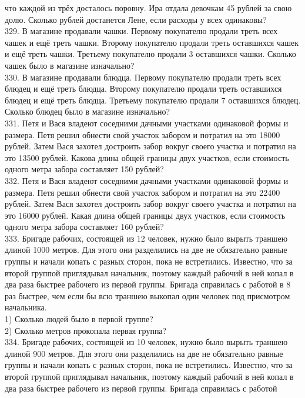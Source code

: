 \documentclass[12pt]{article}
\begin{document}
что каждой из трёх досталось поровну. Ира отдала девочкам 45 рублей за свою долю. Сколько рублей достанется Лене, если расходы у всех одинаковы?\\
329. В магазине продавали чашки. Первому покупателю продали треть всех чашек и ещё треть чашки. Второму покупателю продали треть оставшихся чашек и ещё
треть чашки. Третьему покупателю продали 3 оставшихся чашки. Сколько чашек было в магазине изначально?\\
330. В магазине продавали блюдца. Первому покупателю продали треть всех блюдец и ещё треть блюдца. Второму покупателю продали треть оставшихся блюдец
и ещё треть блюдца. Третьему покупателю продали 7 оставшихся блюдец. Сколько блюдец было в магазине изначально?\\
331. Петя и Вася владеют соседними дачными участками одинаковой формы и размера. Петя решил
обнести свой участок забором и потратил на это 18000 рублей. Затем Вася захотел достроить забор
вокруг своего участка и потратил на это 13500 рублей. Какова длина общей границы двух участков,
если стоимость одного метра забора составляет 150 рублей?\\
332.  Петя и Вася владеют соседними дачными участками одинаковой формы и размера. Петя решил
обнести свой участок забором и потратил на это 22400 рублей. Затем Вася захотел достроить забор
вокруг своего участка и потратил на это 16000 рублей. Какая длина общей границы двух участков,
если стоимость одного метра забора составляет 160 рублей?\\
333.  Бригаде рабочих, состоящей из 12 человек, нужно было вырыть траншею длиной 1000 метров.
Для этого они разделились на две не обязательно равные группы и начали копать с разных сторон,
пока не встретились. Известно, что за второй группой приглядывал начальник, поэтому каждый
рабочий в ней копал в два раза быстрее рабочего из первой группы. Бригада справилась с работой
в 8 раз быстрее, чем если бы всю траншею выкопал один человек под присмотром начальника.\\
1) Сколько людей было в первой группе?\\
2) Сколько метров прокопала первая группа?\\
334. Бригаде рабочих, состоящей из 10 человек, нужно было вырыть траншею длиной 900 метров.
Для этого они разделились на две не обязательно равные группы и начали копать с разных сторон,
пока не встретились. Известно, что за второй группой приглядывал начальник, поэтому каждый
рабочий в ней копал в два раза быстрее рабочего из первой группы. Бригада справилась с работой
\end{document}
